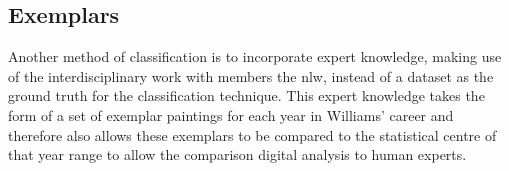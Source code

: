 \subsection{Exemplars}
Another method of classification is to incorporate expert knowledge, making use of the 
interdisciplinary work with members the \gls{nlw}, instead of a dataset as the ground truth for
the classification technique. This expert knowledge takes the form of a set of exemplar paintings
for each year in Williams' career and therefore also allows these exemplars to be compared to the
statistical centre of that year range to allow the comparison digital analysis to human experts.
